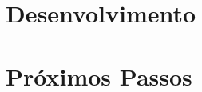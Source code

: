 \documentclass[tg]{ita}    %
\begin{document}
\chapter{Desenvolvimento} \label{chdev}


\chapter{Próximos Passos} \label{chroadmap}


\renewcommand\bibname{\itareferencesnamebabel} %



%

%


\end{document}

